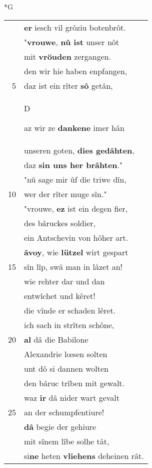 \documentclass[8pt,a4paper,notitlepage]{article}
\begin{document}
\newpage
\begin{table}[ht]
\begin{minipage}[t]{0.5\linewidth}
\small
\begin{center}*G
\end{center}
\begin{tabular}{rl}
 & \textbf{er} iesch vil grôziu botenbrôt.\\ 
 & "\textbf{vrouwe}, \textbf{nû ist} unser nôt\\ 
 & mit \textbf{vröuden} zergangen.\\ 
 & den wir hie haben enpfangen,\\ 
5 & daz ist ein rîter \textbf{sô} getân,\\ 
 & \begin{large}D\end{large}az wir ze \textbf{dankene} imer hân\\ 
 & unseren goten, \textbf{dies gedâhten},\\ 
 & daz \textbf{sin uns her brâhten}."\\ 
 & "nû sage mir ûf die triwe dîn,\\ 
10 & wer der rîter muge sîn."\\ 
 & "vrouwe, \textbf{ez} ist ein degen fier,\\ 
 & des bâruckes soldier,\\ 
 & ein Antschevin von hôher art.\\ 
 & \textbf{âvoy}, wie \textbf{lützel} wirt gespart\\ 
15 & sîn lîp, swâ man in lâzet an!\\ 
 & wie rehter dar und dan\\ 
 & entwîchet und kêret!\\ 
 & die vînde er schaden lêret.\\ 
 & ich sach in strîten schône,\\ 
20 & \textbf{al} dâ die Babilone\\ 
 & Alexandrie lœsen solten\\ 
 & unt dô si dannen wolten\\ 
 & den bâruc trîben mit gewalt.\\ 
 & waz \textbf{ir} dâ nider wart gevalt\\ 
25 & an der schumpfentiure!\\ 
 & \textbf{dâ} begie der gehiure\\ 
 & mit sînem lîbe solhe tât,\\ 
 & si\textbf{ne} heten \textbf{vliehens} deheinen rât.\\ 

\end{tabular}
\end{minipage}
\end{table}
\end{document}
